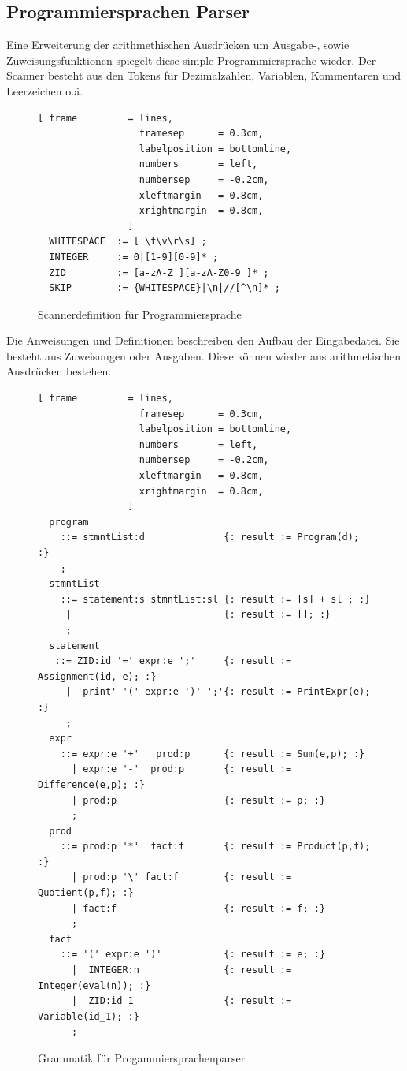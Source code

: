 \subsection{Programmiersprachen Parser}
Eine Erweiterung der arithmethischen Ausdrücken um Ausgabe-, sowie Zuweisungsfunktionen spiegelt diese simple Programmiersprache wieder.
Der Scanner  besteht aus den Tokens für Dezimalzahlen, Variablen, Kommentaren und Leerzeichen o.ä.
\begin{figure}[!htb]
\begin{Verbatim}[ frame         = lines, 
                  framesep      = 0.3cm, 
                  labelposition = bottomline,
                  numbers       = left,
                  numbersep     = -0.2cm,
                  xleftmargin   = 0.8cm,
                  xrightmargin  = 0.8cm,
                ]
  WHITESPACE  := [ \t\v\r\s] ;
  INTEGER     := 0|[1-9][0-9]* ;
  ZID         := [a-zA-Z_][a-zA-Z0-9_]* ;
  SKIP        := {WHITESPACE}|\n|//[^\n]* ;
\end{Verbatim}
\caption{Scannerdefinition für Programmiersprache}
\label{fig:example_interpreter_grammar_scanner}
\end{figure}
Die Anweisungen und Definitionen  beschreiben den Aufbau der Eingabedatei. Sie besteht aus Zuweisungen oder Ausgaben. Diese können wieder aus arithmetischen Ausdrücken bestehen.
\begin{figure}[!htb]

\begin{Verbatim}[ frame         = lines, 
                  framesep      = 0.3cm, 
                  labelposition = bottomline,
                  numbers       = left,
                  numbersep     = -0.2cm,
                  xleftmargin   = 0.8cm,
                  xrightmargin  = 0.8cm,
                ]
  program 
    ::= stmntList:d              {: result := Program(d); :}
    ;
  stmntList
    ::= statement:s stmntList:sl {: result := [s] + sl ; :}
     |                           {: result := []; :}
     ;
  statement 
   ::= ZID:id '=' expr:e ';'     {: result := Assignment(id, e); :}    
     | 'print' '(' expr:e ')' ';'{: result := PrintExpr(e); :}                                 
     ;
  expr 
    ::= expr:e '+'   prod:p      {: result := Sum(e,p); :} 
      | expr:e '-'  prod:p       {: result := Difference(e,p); :} 
      | prod:p                   {: result := p; :}
      ;
  prod 
    ::= prod:p '*'  fact:f       {: result := Product(p,f); :}
      | prod:p '\' fact:f        {: result := Quotient(p,f); :} 
      | fact:f                   {: result := f; :}
      ;
  fact 
    ::= '(' expr:e ')'           {: result := e; :} 
      |  INTEGER:n               {: result := Integer(eval(n)); :} 
      |  ZID:id_1                {: result := Variable(id_1); :}
      ;
\end{Verbatim}
\caption{Grammatik für Progammiersprachenparser}
\label{fig:example_interpreter_grammar_statements}
\end{figure}
